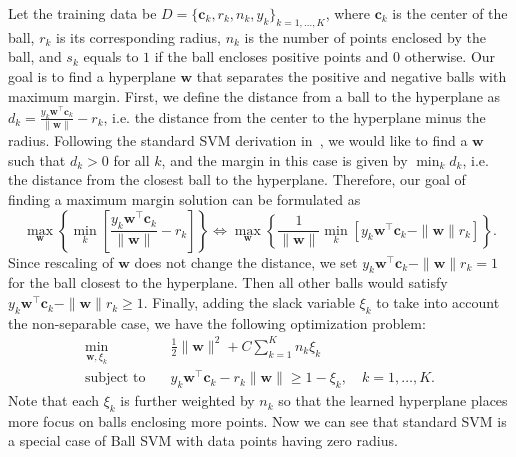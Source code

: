 \documentclass[12pt]{article}
\newcommand{\bc}{\mathbf{c}}
\newcommand{\bw}{\mathbf{w}}
\begin{document}
Let the training data be $D = \{\bc_k, r_k, n_k, y_k\}_{k=1,\ldots,K}$, where $\bc_k$ is the center of the ball, $r_k$ is its corresponding radius, $n_k$ is the number of points enclosed by the ball, and $s_k$ equals to $1$ if the ball encloses positive points and $0$ otherwise. Our goal is to find a hyperplane $\bw$ that separates the positive and negative balls with maximum margin. First, we define the distance from a ball to the hyperplane as $d_k = \frac{y_k\bw^{\top}\bc_k}{\|\bw\|} - r_k$, i.e. the distance from the center to the hyperplane minus the radius.  Following the standard SVM derivation in~\cite{prml}, we would like to find a $\bw$ such that $d_k > 0$ for all $k$, and the margin in this case is given by $\min_k d_k$, i.e. the distance from the closest ball to the hyperplane. Therefore, our goal of finding a maximum margin solution can be formulated as
\begin{equation}
\max_{\bw}\left\{\min_k\left[\frac{y_k\bw^{\top}\bc_k}{\|\bw\|} - r_k\right]\right\} \Longleftrightarrow \max_{\bw}\left\{\frac{1}{\|\bw\|}\min_k\left[y_k\bw^{\top}\bc_k - \|\bw\|r_k\right]\right\}.
\end{equation}
Since rescaling of $\bw$ does not change the distance, we set $y_k\bw^{\top}\bc_k - \|\bw\|r_k = 1$ for the ball closest to the hyperplane. Then all other balls would satisfy $y_k\bw^{\top}\bc_k - \|\bw\|r_k \ge 1$. Finally, adding the slack variable $\xi_k$ to take into account the non-separable case, we have the following optimization problem:
\begin{align}
\min_{\bw, \xi_k} &\quad\frac{1}{2} \| \bw \|^2 + C \sum_{k=1}^K n_k \xi_k \nonumber\\
\text{subject to} &\quad y_k\bw^{\top}\bc_k - r_k\|\bw\| \ge 1 - \xi_k, \quad k = 1, \ldots, K.
\end{align}
Note that each $\xi_k$ is further weighted by $n_k$ so that the learned hyperplane places more focus on balls enclosing more points. Now we can see that standard SVM is a special case of Ball SVM with data points having zero radius.
\end{document}
